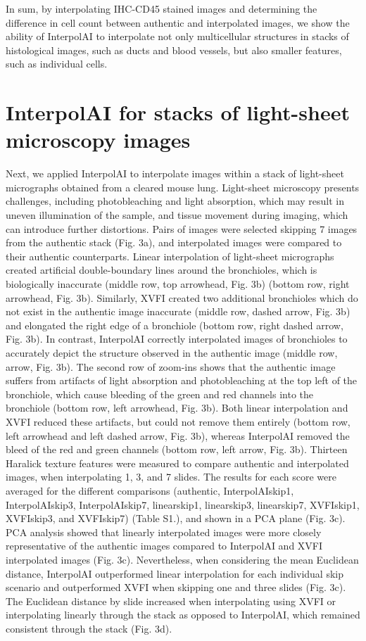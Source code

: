 \begin{refsection}
    In sum, by interpolating IHC-CD45 stained images and determining the difference in cell count between authentic and interpolated images, we show the ability of InterpolAI to interpolate not only multicellular structures in stacks of histological images, such as ducts and blood vessels, but also smaller features, such as individual cells. 
    
    \section{InterpolAI for stacks of light-sheet microscopy images}
    Next, we applied InterpolAI to interpolate images within a stack of light-sheet micrographs obtained from a cleared mouse lung. Light-sheet microscopy presents challenges, including photobleaching and light absorption, which may result in uneven illumination of the sample, and tissue movement during imaging, which can introduce further distortions. Pairs of images were selected skipping 7 images from the authentic stack (Fig. 3a), and interpolated images were compared to their authentic counterparts.    
    Linear interpolation of light-sheet micrographs created artificial double-boundary lines around the bronchioles, which is biologically inaccurate (middle row, top arrowhead, Fig. 3b) (bottom row, right arrowhead, Fig. 3b). Similarly, XVFI created two additional bronchioles which do not exist in the authentic image inaccurate (middle row, dashed arrow, Fig. 3b) and elongated the right edge of a bronchiole (bottom row, right dashed arrow, Fig. 3b). In contrast, InterpolAI correctly interpolated images of bronchioles to accurately depict the structure observed in the authentic image (middle row, arrow, Fig. 3b). The second row of zoom-ins shows that the authentic image suffers from artifacts of light absorption and photobleaching at the top left of the bronchiole, which cause bleeding of the green and red channels into the bronchiole (bottom row, left arrowhead, Fig. 3b). Both linear interpolation and XVFI reduced these artifacts, but could not remove them entirely (bottom row, left arrowhead and left dashed arrow, Fig. 3b), whereas InterpolAI removed the bleed of the red and green channels (bottom row, left arrow, Fig. 3b). 
    Thirteen Haralick texture features were measured to compare authentic and interpolated images, when interpolating 1, 3, and 7 slides. The results for each score were averaged for the different comparisons (authentic, InterpolAIskip1, InterpolAIskip3, InterpolAIskip7, linearskip1, linearskip3, linearskip7, XVFIskip1, XVFIskip3, and XVFIskip7) (Table S1.), and shown in a PCA plane (Fig. 3c). PCA analysis showed that linearly interpolated images were more closely representative of the authentic images compared to InterpolAI and XVFI interpolated images (Fig. 3c).  Nevertheless, when considering the mean Euclidean distance, InterpolAI outperformed linear interpolation for each individual skip scenario and outperformed XVFI when skipping one and three slides (Fig. 3c). The Euclidean distance by slide increased when interpolating using XVFI or interpolating linearly through the stack as opposed to InterpolAI, which remained consistent through the stack (Fig. 3d).

\end{refsection}
